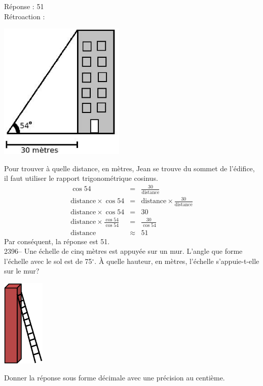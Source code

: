 \documentclass[letterpaper, 12pt]{article}
\begin{document}
R\'eponse : 51\\

R\'etroaction :\\
\begin{center}
 \includegraphics[width=6cm,bb=14 14 320 339]{Q2394.eps}
\end{center}
Pour trouver \`a quelle distance, en m\`etres, Jean se trouve du sommet de l'\'edifice, il faut utiliser le rapport trigonom\'etrique cosinus.
\begin{eqnarray*}
\cos{54}&=&\frac{30}{\textrm{distance}}\\[2mm]
\textrm{distance} \times \cos{54}&=&\textrm{distance} \times \frac{30}{\textrm{distance}}\\[2mm]
\textrm{distance} \times \cos{54}&=& 30\\[2mm]
\textrm{distance} \times \frac{\cos{54}}{\cos{54}}&=& \frac{30}{\cos{54}}\\[2mm]
\textrm{distance} &\approx&51
\end{eqnarray*}
Par cons\'equent, la r\'eponse est 51.\\

2396-- Une \'echelle de cinq m\`etres est appuy\'ee sur un mur. L'angle que forme l'\'echelle avec le sol est de 75$^{\circ}$. \`A quelle hauteur, en m\`etres, l'\'echelle s'appuie-t-elle sur le mur?\\
\begin{center}
 \includegraphics[width=2cm,bb=14 14 332 623]{Q2396.eps}
\end{center}
Donner la r\'eponse sous forme d\'ecimale avec une pr\'ecision au centi\`eme.\\
\end{document}

